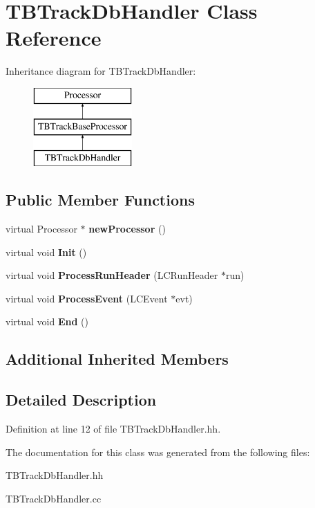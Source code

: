 \section{T\-B\-Track\-Db\-Handler Class Reference}
\label{classTBTrackDbHandler}
Inheritance diagram for T\-B\-Track\-Db\-Handler\-:\begin{figure}[H]
\begin{center}
\leavevmode
\includegraphics[height=3.000000cm]{classTBTrackDbHandler}
\end{center}
\end{figure}
\subsection*{Public Member Functions}
\begin{DoxyCompactItemize}
\item 
virtual Processor $\ast$ {\bfseries new\-Processor} ()\label{classTBTrackDbHandler_abe806895dc04980136469ac90bcc9982}

\item 
virtual void {\bfseries Init} ()\label{classTBTrackDbHandler_a57e8094c85725134aa69b7fbf7b7b8eb}

\item 
virtual void {\bfseries Process\-Run\-Header} (L\-C\-Run\-Header $\ast$run)\label{classTBTrackDbHandler_afc16f115885dc980dd75aaa41efceb81}

\item 
virtual void {\bfseries Process\-Event} (L\-C\-Event $\ast$evt)\label{classTBTrackDbHandler_aab729168e31d8f81a28800164444cadc}

\item 
virtual void {\bfseries End} ()\label{classTBTrackDbHandler_a2db2ea2c3d53cd585a21f5130def6732}

\end{DoxyCompactItemize}
\subsection*{Additional Inherited Members}


\subsection{Detailed Description}


Definition at line 12 of file T\-B\-Track\-Db\-Handler.\-hh.



The documentation for this class was generated from the following files\-:\begin{DoxyCompactItemize}
\item 
T\-B\-Track\-Db\-Handler.\-hh\item 
T\-B\-Track\-Db\-Handler.\-cc\end{DoxyCompactItemize}

